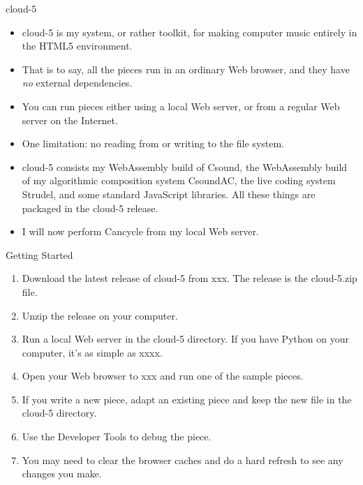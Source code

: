 \documentclass{beamer}
\begin{document}
\begin{frame}{cloud-5}

\begin{itemize}
\item cloud-5 is my system, or rather toolkit, for making computer music entirely in the HTML5 environment.
\item That is to say, all the pieces run in an ordinary Web browser, and they have \emph{no} external dependencies.
\item You can run  pieces either using a local Web server, or from a regular Web server on the Internet.
\item One limitation: no reading from or writing to the file system.
\item cloud-5 consists my WebAssembly build of Csound, the WebAssembly build of my algorithmic composition system CsoundAC, the live coding system Strudel, and some standard JavaScript libraries.  All these things are packaged in the cloud-5 release.
\item I will now perform Cancycle from my local Web server.
\end{itemize}

\end{frame}

\begin{frame}{Getting Started}

\begin{enumerate}
\item Download the latest release of cloud-5 from xxx. The release is the cloud-5.zip file.
\item Unzip the release on your computer.
\item Run a local Web server in the cloud-5 directory. If you have Python on your computer, it's as simple as xxxx.
\item Open your Web browser to xxx and run one of the sample pieces.
\item If you write a new piece, adapt an existing piece and keep the new file in the cloud-5 directory.
\item Use the Developer Tools to debug the piece.
\item You may need to clear the browser caches and do a hard refresh to see any changes you make.
\end{enumerate}

\end{frame}
\end{document}
